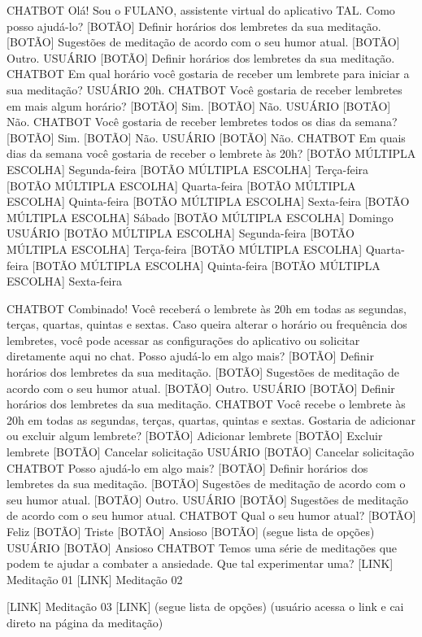 CHATBOT
Olá! Sou o FULANO, assistente virtual do aplicativo TAL. Como posso ajudá-lo?
[BOTÃO] Definir horários dos lembretes da sua meditação.
[BOTÃO] Sugestões de meditação de acordo com o seu humor atual.
[BOTÃO] Outro.
USUÁRIO
[BOTÃO] Definir horários dos lembretes da sua meditação.
CHATBOT
Em qual horário você gostaria de receber um lembrete para iniciar a sua meditação?
USUÁRIO
20h.
CHATBOT
Você gostaria de receber lembretes em mais algum horário?
[BOTÃO] Sim.
[BOTÃO] Não.
USUÁRIO
[BOTÃO] Não.
CHATBOT
Você gostaria de receber lembretes todos os dias da semana?
[BOTÃO] Sim.
[BOTÃO] Não.
USUÁRIO
[BOTÃO] Não.
CHATBOT
Em quais dias da semana você gostaria de receber o lembrete às 20h?
[BOTÃO MÚLTIPLA ESCOLHA] Segunda-feira
[BOTÃO MÚLTIPLA ESCOLHA] Terça-feira
[BOTÃO MÚLTIPLA ESCOLHA] Quarta-feira
[BOTÃO MÚLTIPLA ESCOLHA] Quinta-feira
[BOTÃO MÚLTIPLA ESCOLHA] Sexta-feira
[BOTÃO MÚLTIPLA ESCOLHA] Sábado
[BOTÃO MÚLTIPLA ESCOLHA] Domingo
USUÁRIO
[BOTÃO MÚLTIPLA ESCOLHA] Segunda-feira
[BOTÃO MÚLTIPLA ESCOLHA] Terça-feira
[BOTÃO MÚLTIPLA ESCOLHA] Quarta-feira
[BOTÃO MÚLTIPLA ESCOLHA] Quinta-feira
[BOTÃO MÚLTIPLA ESCOLHA] Sexta-feira

CHATBOT
Combinado! Você receberá o lembrete às 20h em todas as segundas, terças, quartas,
quintas e sextas. Caso queira alterar o horário ou frequência dos lembretes, você pode
acessar as configurações do aplicativo ou solicitar diretamente aqui no chat. Posso
ajudá-lo em algo mais?
[BOTÃO] Definir horários dos lembretes da sua meditação.
[BOTÃO] Sugestões de meditação de acordo com o seu humor atual.
[BOTÃO] Outro.
USUÁRIO
[BOTÃO] Definir horários dos lembretes da sua meditação.
CHATBOT
Você recebe o lembrete às 20h em todas as segundas, terças, quartas, quintas e
sextas. Gostaria de adicionar ou excluir algum lembrete?
[BOTÃO] Adicionar lembrete
[BOTÃO] Excluir lembrete
[BOTÃO] Cancelar solicitação
USUÁRIO
[BOTÃO] Cancelar solicitação
CHATBOT
Posso ajudá-lo em algo mais?
[BOTÃO] Definir horários dos lembretes da sua meditação.
[BOTÃO] Sugestões de meditação de acordo com o seu humor atual.
[BOTÃO] Outro.
USUÁRIO
[BOTÃO] Sugestões de meditação de acordo com o seu humor atual.
CHATBOT
Qual o seu humor atual?
[BOTÃO] Feliz
[BOTÃO] Triste
[BOTÃO] Ansioso
[BOTÃO] (segue lista de opções)
USUÁRIO
[BOTÃO] Ansioso
CHATBOT
Temos uma série de meditações que podem te ajudar a combater a ansiedade. Que tal
experimentar uma?
[LINK] Meditação 01
[LINK] Meditação 02

[LINK] Meditação 03
[LINK] (segue lista de opções)
(usuário acessa o link e cai direto na página da meditação)